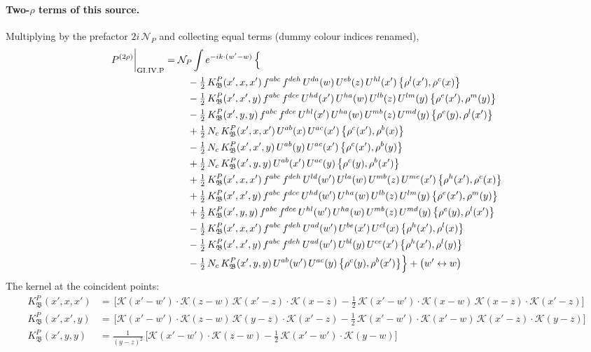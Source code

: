 \documentclass[10pt]{article}
\numberwithin{equation}{section}
\newcommand{\KK}{\mathcal K}
\newcommand{\NP}{\mathcal N_{P}}
\begin{document}
\paragraph{Two-$\rho$ terms of this source.} Multiplying by the prefactor $2i\,\NP$ and collecting equal terms (dummy colour indices renamed),
\begin{align}
P^{(2\rho)}\bigg|_{\rm GI.IV.P}={}&\NP\int e^{-ik\cdot(w'-w)}\,\Big\{\notag\\
&\quad -\tfrac12\,K^{P}_{\mathfrak B}(x',x,x')\,f^{abc}\,f^{deh}\,U^{da}(w)\,U^{eb}(z)\,U^{hl}(x')\,\big\{\rho^{l}(x'),\rho^{c}(x)\big\}\notag\\
&\quad -\tfrac12\,K^{P}_{\mathfrak B}(x',x',y)\,f^{abc}\,f^{dce}\,U^{hd}(x')\,U^{ha}(w)\,U^{lb}(z)\,U^{lm}(y)\,\big\{\rho^{e}(x'),\rho^{m}(y)\big\}\notag\\
&\quad -\tfrac12\,K^{P}_{\mathfrak B}(x',y,y)\,f^{abc}\,f^{dce}\,U^{hl}(x')\,U^{ha}(w)\,U^{mb}(z)\,U^{md}(y)\,\big\{\rho^{e}(y),\rho^{l}(x')\big\}\notag\\
&\quad +\tfrac12\,N_{c}\,K^{P}_{\mathfrak B}(x',x,x')\,U^{ab}(x)\,U^{ac}(x')\,\big\{\rho^{c}(x'),\rho^{b}(x)\big\}\notag\\
&\quad -\tfrac12\,N_{c}\,K^{P}_{\mathfrak B}(x',x',y)\,U^{ab}(y)\,U^{ac}(x')\,\big\{\rho^{c}(x'),\rho^{b}(y)\big\}\notag\\
&\quad +\tfrac12\,N_{c}\,K^{P}_{\mathfrak B}(x',y,y)\,U^{ab}(x')\,U^{ac}(y)\,\big\{\rho^{c}(y),\rho^{b}(x')\big\}\notag\\
&\quad +\tfrac12\,K^{P}_{\mathfrak B}(x',x,x')\,f^{abc}\,f^{deh}\,U^{ld}(w')\,U^{la}(w)\,U^{mb}(z)\,U^{me}(x')\,\big\{\rho^{h}(x'),\rho^{c}(x)\big\}\notag\\
&\quad +\tfrac12\,K^{P}_{\mathfrak B}(x',x',y)\,f^{abc}\,f^{dce}\,U^{hd}(w')\,U^{ha}(w)\,U^{lb}(z)\,U^{lm}(y)\,\big\{\rho^{e}(x'),\rho^{m}(y)\big\}\notag\\
&\quad +\tfrac12\,K^{P}_{\mathfrak B}(x',y,y)\,f^{abc}\,f^{dce}\,U^{hl}(w')\,U^{ha}(w)\,U^{mb}(z)\,U^{md}(y)\,\big\{\rho^{e}(y),\rho^{l}(x')\big\}\notag\\
&\quad -\tfrac12\,K^{P}_{\mathfrak B}(x',x,x')\,f^{abc}\,f^{deh}\,U^{ad}(w')\,U^{be}(x')\,U^{cl}(x)\,\big\{\rho^{h}(x'),\rho^{l}(x)\big\}\notag\\
&\quad -\tfrac12\,K^{P}_{\mathfrak B}(x',x',y)\,f^{abc}\,f^{deh}\,U^{ad}(w')\,U^{bl}(y)\,U^{ce}(x')\,\big\{\rho^{h}(x'),\rho^{l}(y)\big\}\notag\\
&\quad -\tfrac12\,N_{c}\,K^{P}_{\mathfrak B}(x',y,y)\,U^{ab}(w')\,U^{ac}(y)\,\big\{\rho^{c}(y),\rho^{b}(x')\big\}\Big\}+\big(w'\leftrightarrow w\big)\label{eq:res-GI.IV.P}
\end{align}
The kernel at the coincident points:
\begin{align*}
K^{P}_{\mathfrak B}(x',x,x')&=\,\Big[\KK(x'-w')\cdot\KK(z-w)\,\KK(x'-z)\cdot\KK(x-z)-\frac{1}{2}\,\KK(x'-w')\cdot\KK(x-w)\,\KK(x-z)\cdot\KK(x'-z)\Big]\\K^{P}_{\mathfrak B}(x',x',y)&=\,\Big[\KK(x'-w')\cdot\KK(z-w)\,\KK(y-z)\cdot\KK(x'-z)-\frac{1}{2}\,\KK(x'-w')\cdot\KK(x'-w)\,\KK(x'-z)\cdot\KK(y-z)\Big]\\K^{P}_{\mathfrak B}(x',y,y)&=\frac{1}{(y-z)^2}\,\Big[\KK(x'-w')\cdot\KK(z-w)-\frac{1}{2}\,\KK(x'-w')\cdot\KK(y-w)\Big]
\end{align*}
\end{document}
